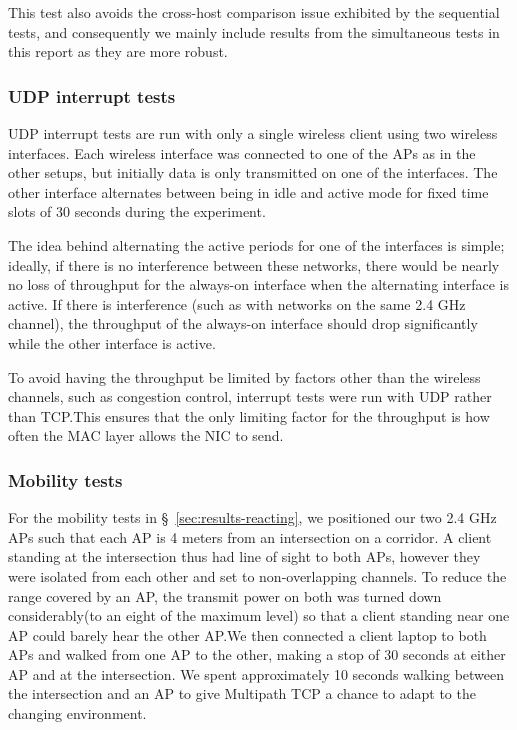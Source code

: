 This test also avoids the cross-host comparison issue exhibited by the
sequential tests, and consequently we mainly include results from the
simultaneous tests in this report as they are more robust.

\subsubsection{UDP interrupt tests}
\label{sec:met:setups:intudp}
UDP interrupt tests are run with only a single wireless client using two
wireless interfaces. Each wireless interface was connected to one of the APs as
in the other setups, but initially data is only transmitted on one of the
interfaces.  The other interface alternates between being in idle and active
mode for fixed time slots of 30 seconds during the experiment.

The idea behind alternating the active periods for one of the interfaces is
simple; ideally, if there is no interference between these networks, there would
be nearly no loss of throughput for the always-on interface when the alternating
interface is active. If there is interference (such as with networks on the same
2.4 GHz channel), the throughput of the always-on interface should drop
significantly while the other interface is active.

To avoid having the throughput be limited by factors other than the wireless
channels, such as congestion control, interrupt tests were run with UDP rather
than TCP.\@ This ensures that the only limiting factor for the throughput is how
often the MAC layer allows the NIC to send.

\subsubsection{Mobility tests}
\label{sec:met:setups:mobility}
For the mobility tests in \S~\ref{sec:results-reacting}, we positioned our two
2.4 GHz APs such that each AP is 4 meters from an intersection on a corridor. 
A client standing at the intersection thus had line of sight to both 
APs, however they were isolated from each other and set to non-overlapping 
channels. To reduce the range covered by an AP, the transmit power on both was 
turned down considerably(to an eight of the maximum level) so that a client 
standing near one AP could barely hear the other AP.\@ We then connected a 
client laptop to both APs and walked from one AP to the other, making a stop of 
30 seconds at either AP and at the intersection. We spent approximately 10 
seconds walking between the intersection and an AP to give Multipath TCP a 
chance to adapt to the changing environment.

